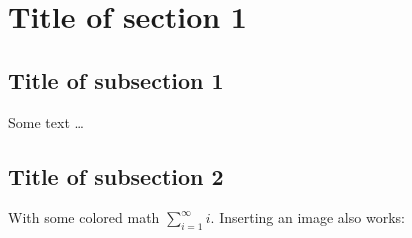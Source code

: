 \section{Title of section 1}
\subsection*{Title of subsection 1}
Some text \ldots
\subsection*{Title of subsection 2}
With some colored math $\sum_{i=1}^\infty i$.
Inserting an image also works:\\
